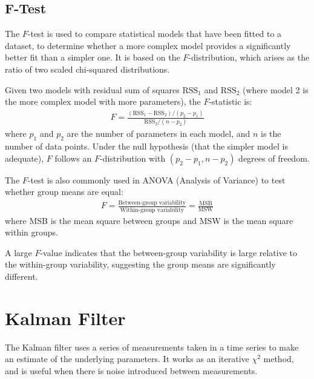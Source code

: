\subsection{F-Test}
The $F$-test is used to compare statistical models that have been fitted to a dataset, to determine whether a more complex model provides a significantly better fit than a simpler one. It is based on the $F$-distribution, which arises as the ratio of two scaled chi-squared distributions.

Given two models with residual sum of squares $\text{RSS}_1$ and $\text{RSS}_2$ (where model 2 is the more complex model with more parameters), the $F$-statistic is:
\begin{align}
	F = \frac{(\text{RSS}_1 - \text{RSS}_2) / (p_2 - p_1)}{\text{RSS}_2 / (n - p_2)}
\end{align}
where $p_1$ and $p_2$ are the number of parameters in each model, and $n$ is the number of data points. Under the null hypothesis (that the simpler model is adequate), $F$ follows an $F$-distribution with $(p_2 - p_1, n - p_2)$ degrees of freedom.

The $F$-test is also commonly used in ANOVA (Analysis of Variance) to test whether group means are equal:
\begin{align}
	F = \frac{\text{Between-group variability}}{\text{Within-group variability}} = \frac{\text{MSB}}{\text{MSW}}
\end{align}
where MSB is the mean square between groups and MSW is the mean square within groups.

A large $F$-value indicates that the between-group variability is large relative to the within-group variability, suggesting the group means are significantly different.

\section{Kalman Filter}
The Kalman filter\cite{fruwirth} uses a series of measurements taken in a time series to make an estimate of the underlying parameters. It works as an iterative $\chi^2$ method, and is useful when there is noise introduced between measurements.

